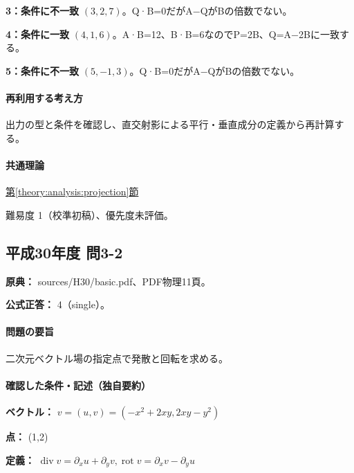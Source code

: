 \noindent\textbf{3：条件に不一致} \((3,2,7)\)。Q·B=\allowbreak{}0だがA−QがBの倍数でない。\par

\noindent\textbf{4：条件に一致} \((4,1,6)\)。A·B=\allowbreak{}12、B·B=\allowbreak{}6なのでP=\allowbreak{}2B、Q=\allowbreak{}A−2Bに一致する。\par

\noindent\textbf{5：条件に不一致} \((5,-1,3)\)。Q·B=\allowbreak{}0だがA−QがBの倍数でない。\par

\paragraph{再利用する考え方} 出力の型と条件を確認し、直交射影による平行・垂直成分の定義から再計算する。

\paragraph{共通理論} \hyperref[theory:analysis:projection]{第\ref*{theory:analysis:projection}節}

\par 難易度 1（校準初稿）、優先度未評価。

\subsection{平成30年度 問3-2}
\label{q:h30-reg-basic-3-2}

\noindent\textbf{原典：} sources/H30/basic.pdf、PDF物理11頁。

\textbf{公式正答：} 4（single）。

\paragraph{問題の要旨} 二次元ベクトル場の指定点で発散と回転を求める。

\paragraph{確認した条件・記述（独自要約）}\mbox{}\par

\noindent\textbf{ベクトル：} \(v=(u,v)=(-x^2+2xy,2xy-y^2)\)\par

\noindent\textbf{点：} (1,2)\par

\noindent\textbf{定義：} \(\operatorname{div}v=\partial_xu+\partial_yv,\operatorname{rot}v=\partial_xv-\partial_yu\)\par


